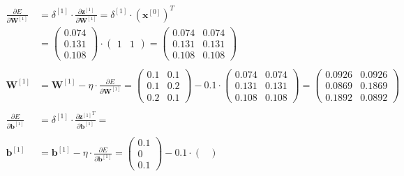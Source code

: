 \documentclass[12pt]{article}
\begin{document}
\begin{enumerate}
\begin{equation*}
    \begin{aligned}
        \frac{\partial E}{\partial \mathbf{W}^{[1]}} &= \delta^{[1]} \cdot \frac{\partial \mathbf{z}^{[1]}}{\partial \mathbf{W}^{[1]}} = \delta^{[1]} \cdot \left(\mathbf{x}^{[0]}\right)^T \\
        &= \begin{pmatrix}
            0.074\\
            0.131\\
            0.108
        \end{pmatrix} \cdot \begin{pmatrix}
            1 & 1 
        \end{pmatrix} = \begin{pmatrix}
            0.074 & 0.074\\
            0.131 & 0.131\\
            0.108 & 0.108
        \end{pmatrix}\\
        \\
        \mathbf{W}^{[1]} &= \mathbf{W}^{[1]} - \eta \cdot \frac{\partial E}{\partial \mathbf{W}^{[1]}} = \begin{pmatrix}
            0.1 & 0.1\\
            0.1 & 0.2\\
            0.2 & 0.1
        \end{pmatrix} - 0.1 \cdot \begin{pmatrix}
            0.074 & 0.074\\
            0.131 & 0.131\\
            0.108 & 0.108
        \end{pmatrix} = \begin{pmatrix}
            0.0926 & 0.0926\\
            0.0869 & 0.1869\\
            0.1892 & 0.0892
        \end{pmatrix}\\
        \\
        \frac{\partial E}{\partial \mathbf{b}^{[1]}}&= \delta^{[1]} \cdot \frac{{\partial \mathbf{z}^{[1]}}^T}{\partial \mathbf{b}^{[1]}} = \\
        \\
        \mathbf{b}^{[1]} &= \mathbf{b}^{[1]} - \eta \cdot \frac{\partial E}{\partial \mathbf{b}^{[1]}} = \begin{pmatrix}
            0.1\\
            0\\
            0.1
        \end{pmatrix} - 0.1 \cdot \begin{pmatrix}
            

\end{pmatrix}
\end{aligned}
\end{equation*}
\end{enumerate}
\end{document}
